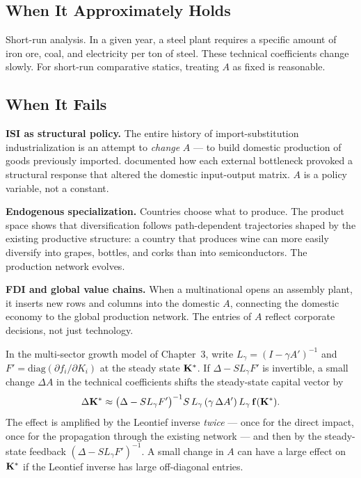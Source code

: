 \documentclass[../structural_economics_book.tex]{subfiles}
\begin{document}
\subsection{When It Approximately Holds}

Short-run analysis. In a given year, a steel plant requires a specific amount of iron ore, coal, and electricity per ton of steel. These technical coefficients change slowly. For short-run comparative statics, treating $A$ as fixed is reasonable.

\subsection{When It Fails}

\textbf{ISI as structural policy.} The entire history of import-substitution industrialization is an attempt to \textit{change} $A$ --- to build domestic production of goods previously imported. \citet{tavares1972substituicao} documented how each external bottleneck provoked a structural response that altered the domestic input-output matrix. $A$ is a policy variable, not a constant.

\textbf{Endogenous specialization.} Countries choose what to produce. The product space \citep{hidalgo2007product} shows that diversification follows path-dependent trajectories shaped by the existing productive structure: a country that produces wine can more easily diversify into grapes, bottles, and corks than into semiconductors. The production network evolves.

\textbf{FDI and global value chains.} When a multinational opens an assembly plant, it inserts new rows and columns into the domestic $A$, connecting the domestic economy to the global production network. The entries of $A$ reflect corporate decisions, not just technology.

\begin{proposition}\label{ch04:prop:A2_growth}
In the multi-sector growth model of Chapter~3, write $L_\gamma = (I - \gamma A')^{-1}$ and $F' = \text{diag}(\partial f_i/\partial K_i)$ at the steady state $\mathbf{K}^*$. If $\Delta - SL_\gamma F'$ is invertible, a small change $\Delta A$ in the technical coefficients shifts the steady-state capital vector by
\begin{equation}
\Delta \mathbf{K}^* \approx \bigl(\Delta - S L_\gamma F'\bigr)^{-1} S\, L_\gamma\,(\gamma\,\Delta A')\,L_\gamma\, \mathbf{f}(\mathbf{K}^*).
\end{equation}
The effect is amplified by the Leontief inverse \textit{twice} --- once for the direct impact, once for the propagation through the existing network --- and then by the steady-state feedback $(\Delta - SL_\gamma F')^{-1}$. A small change in $A$ can have a large effect on $\mathbf{K}^*$ if the Leontief inverse has large off-diagonal entries.
\end{proposition}
\end{document}
